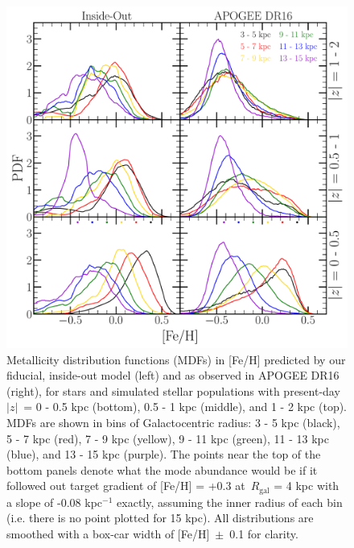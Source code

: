 \documentclass[draft2.tex]{subfiles}
\begin{document}
\begin{figure} 
\centering 
\includegraphics[scale = 0.34]{mdf_3panel_fe.pdf} 
\caption{Metallicity distribution functions (MDFs) in [Fe/H] predicted by our 
fiducial, inside-out model (left) and as observed in APOGEE DR16 (right), for 
stars and simulated stellar populations with present-day~$\left|z\right|$~= 0 - 
0.5 kpc (bottom), 0.5 - 1 kpc (middle), and 1 - 2 kpc (top). MDFs are shown in 
bins of Galactocentric radius: 3 - 5 kpc (black), 5 - 7 kpc (red), 7 - 9 kpc 
(yellow), 9 - 11 kpc (green), 11 - 13 kpc (blue), and 13 - 15 kpc (purple). 
The points near the top of the bottom panels denote what the mode abundance 
would be if it followed out target gradient of [Fe/H] = +0.3 at~$R_\text{gal}$ 
= 4 kpc with a slope of -0.08 kpc$^{-1}$ exactly, assuming the inner radius of 
each bin (i.e. there is no point plotted for 15 kpc). All distributions are 
smoothed with a box-car width of [Fe/H]~$\pm$~0.1 for clarity. } 
\label{fig:mdf_3panel_fe} 
\end{figure} 
\end{document}
